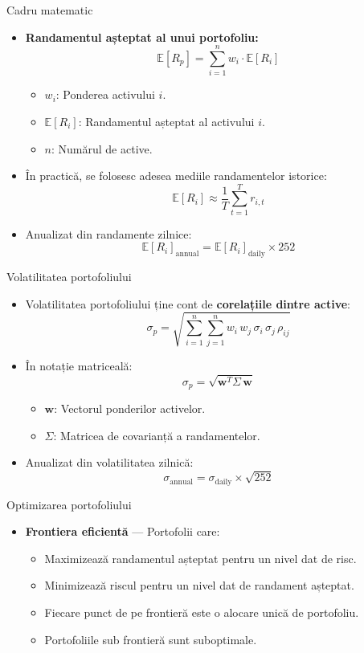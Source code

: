 \documentclass[9pt, aspectratio=169, t]{beamer}
\theoremstyle{definition}
\newcommand{\E}{\mathbb{E}}
\begin{document}
\begin{frame}{Cadru matematic}
\begin{itemize}
    \item \textbf{Randamentul așteptat al unui portofoliu:}
    \[
    \E[R_p] = \sum_{i=1}^n w_i \cdot \E[R_i]
    \]
    \begin{itemize}
        \item $w_i$: Ponderea activului $i$.
        \item $\E[R_i]$: Randamentul așteptat al activului $i$.
        \item $n$: Numărul de active.
    \end{itemize}
    \item În practică, se folosesc adesea mediile randamentelor istorice:
    \[
    \E[R_i] \approx \frac{1}{T}\sum_{t=1}^T r_{i,t}
    \]
    \item Anualizat din randamente zilnice:
    \[
    \E[R_i]_{\text{annual}} = \E[R_i]_{\text{daily}} \times 252
    \]
\end{itemize}
\end{frame}

\begin{frame}{Volatilitatea portofoliului}
\begin{itemize}
    \item Volatilitatea portofoliului ține cont de \textbf{corelațiile dintre active}:
    \[
    \sigma_p = \sqrt{\sum_{i=1}^n\sum_{j=1}^n w_i\, w_j\, \sigma_i\, \sigma_j\, \rho_{ij}}
    \]
    \item În notație matriceală:
    \[
    \sigma_p = \sqrt{\mathbf{w}^T \Sigma\, \mathbf{w}}
    \]
    \begin{itemize}
        \item $\mathbf{w}$: Vectorul ponderilor activelor.
        \item $\Sigma$: Matricea de covarianță a randamentelor.
    \end{itemize}
    \item Anualizat din volatilitatea zilnică:
    \[
    \sigma_{\text{annual}} = \sigma_{\text{daily}} \times \sqrt{252}
    \]
\end{itemize}
\end{frame}

\begin{frame}{Optimizarea portofoliului}
\begin{itemize}
    \item \textbf{Frontiera eficientă} --- Portofolii care:
    \begin{itemize}
        \item Maximizează randamentul așteptat pentru un nivel dat de risc.
        \item Minimizează riscul pentru un nivel dat de randament așteptat.
        \item Fiecare punct de pe frontieră este o alocare unică de portofoliu.
        \item Portofoliile sub frontieră sunt suboptimale.
    \end{itemize}
\end{itemize}
\end{frame}
\end{document}
